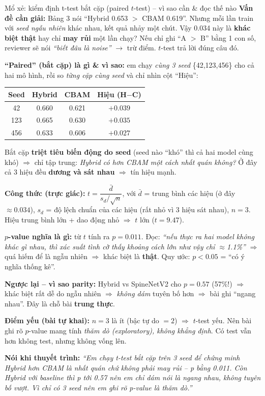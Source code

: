 \documentclass[12pt,a4paper]{article}
\begin{document}
\begin{ctbox}{Mổ xẻ: kiểm định t-test bắt cặp (paired $t$-test) -- vì sao cần \& đọc thế nào}
\textbf{Vấn đề cần giải:} Bảng 3 nói ``Hybrid 0.653 $>$ CBAM 0.619''. Nhưng mỗi lần train với \emph{seed ngẫu nhiên} khác nhau, kết quả nhảy một chút. Vậy 0.034 này là \textbf{khác biệt thật} hay chỉ \textbf{may rủi} một lần chạy? Nếu chỉ ghi ``A $>$ B'' bằng 1 con số, reviewer sẽ nói \emph{``biết đâu là noise''} $\to$ trừ điểm. $t$-test trả lời đúng câu đó.

\textbf{``Paired'' (bắt cặp) là gì \& vì sao:} em chạy \emph{cùng 3 seed} \{42,123,456\} cho cả hai mô hình, rồi so \emph{từng cặp cùng seed} và chỉ nhìn cột ``Hiệu'':
\begin{center}\small
\begin{tabular}{cccc}
\toprule
Seed & Hybrid & CBAM & Hiệu (H$-$C) \\
\midrule
42  & 0.660 & 0.621 & $+0.039$ \\
123 & 0.665 & 0.630 & $+0.035$ \\
456 & 0.633 & 0.606 & $+0.027$ \\
\bottomrule
\end{tabular}
\end{center}
Bắt cặp \textbf{triệt tiêu biến động do seed} (seed nào ``khó'' thì cả hai model cùng khó) $\Rightarrow$ chỉ tập trung: \emph{Hybrid có hơn CBAM một cách nhất quán không?} Ở đây cả 3 hiệu đều \textbf{dương và sát nhau} $\Rightarrow$ tín hiệu mạnh.

\textbf{Công thức (trực giác):} $t=\dfrac{\bar d}{s_d/\sqrt{n}}$, với $\bar d$ = trung bình các hiệu (ở đây $\approx0.034$), $s_d$ = độ lệch chuẩn của các hiệu (rất nhỏ vì 3 hiệu sát nhau), $n=3$. Hiệu trung bình lớn + dao động nhỏ $\Rightarrow$ $t$ lớn ($t=9.47$).

\textbf{$p$-value nghĩa là gì:} từ $t$ tính ra $p=0.011$. Đọc: \emph{``nếu thực ra hai model không khác gì nhau, thì xác suất tình cờ thấy khoảng cách lớn như vậy chỉ $\approx$1.1\%''} $\Rightarrow$ quá hiếm để là ngẫu nhiên $\Rightarrow$ khác biệt là \textbf{thật}. Quy ước: $p<0.05$ = ``có ý nghĩa thống kê''.

\textbf{Ngược lại -- vì sao parity:} Hybrid vs SpineNetV2 cho $p=0.57$ (57\%!) $\Rightarrow$ khác biệt rất dễ do ngẫu nhiên $\Rightarrow$ \emph{không dám} tuyên bố hơn $\Rightarrow$ bài ghi ``ngang nhau''. Đây là chỗ bài \textbf{trung thực}.

\textbf{Điểm yếu (bài tự khai):} $n=3$ là ít (bậc tự do $=2$) $\Rightarrow$ $t$-test yếu. Nên bài ghi rõ $p$-value mang tính \emph{thăm dò (exploratory), không khẳng định}. Có test vẫn hơn không test, nhưng không vống lên.

\textbf{Nói khi thuyết trình:} \emph{``Em chạy t-test bắt cặp trên 3 seed để chứng minh Hybrid hơn CBAM là nhất quán chứ không phải may rủi -- p bằng 0.011. Còn Hybrid với baseline thì p tới 0.57 nên em chỉ dám nói là ngang nhau, không tuyên bố vượt. Vì chỉ có 3 seed nên em ghi rõ p-value là thăm dò.''}
\end{ctbox}
\end{document}
